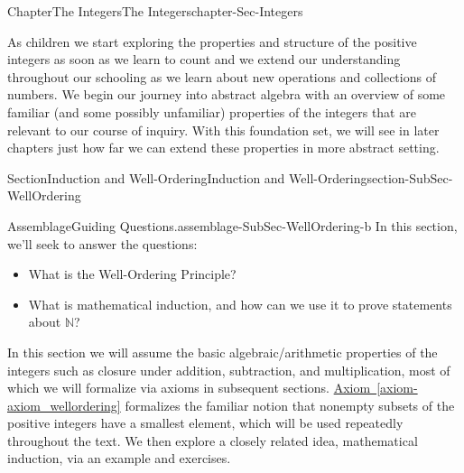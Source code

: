 \documentclass[oneside,10pt,]{book}
\newcommand{\xreffont}{\relax}
\numberwithin{equation}{section}
\def\N{{\mathbb N}}
\begin{document}
\tableofcontents
\mainmatter
%
%
\typeout{************************************************}
\typeout{************************************************}
%
\begin{chapterptx}{Chapter}{The Integers}{}{The Integers}{}{}{chapter-Sec-Integers}
\renewcommand*{\chaptername}{Chapter}
\begin{introduction}{}%
As children we start exploring the properties and structure of the positive integers as soon as we learn to count and we extend our understanding throughout our schooling as we learn about new operations and collections of numbers. We begin our journey into abstract algebra with an overview of some familiar (and some possibly unfamiliar) properties of the integers that are relevant to our course of inquiry. With this foundation set, we will see in later chapters just how far we can extend these properties in more abstract setting.%
\end{introduction}%
%
%
\typeout{************************************************}
\typeout{************************************************}
%
\begin{sectionptx}{Section}{Induction and Well-Ordering}{}{Induction and Well-Ordering}{}{}{section-SubSec-WellOrdering}
\begin{assemblage}{Assemblage}{Guiding Questions.}{assemblage-SubSec-WellOrdering-b}%
In this section, we'll seek to answer the questions: %
\begin{itemize}[label=\textbullet]
\item{}What is the Well-Ordering Principle?%
\item{}What is mathematical induction, and how can we use it to prove statements about \(\N\)?%
\end{itemize}
%
\end{assemblage}
\begin{introduction}{}%
In this section we will assume the basic algebraic\slash{}arithmetic properties of the integers such as closure under addition, subtraction, and multiplication, most of which we will formalize via axioms in subsequent sections. \hyperref[axiom-axiom_wellordering]{Axiom~{\xreffont\ref{axiom-axiom_wellordering}}} formalizes the familiar notion that nonempty subsets of the positive integers have a smallest element, which will be used repeatedly throughout the text. We then explore a closely related idea, mathematical induction, via an example and exercises.%
\end{introduction}%

\end{sectionptx}
\end{chapterptx}
\end{document}
